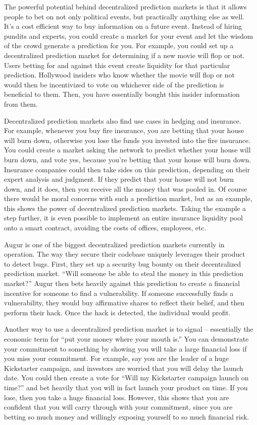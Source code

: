 \documentclass[full.tex]{subfiles}
\begin{document}
    The powerful potential behind decentralized prediction markets is that it allows people to bet on not only political events, but practically anything else as well. It's a cost efficient way to buy information on a future event. Instead of hiring pundits and experts, you could create a market for your event and let the wisdom of the crowd generate a prediction for you. For example, you could set up a decentralized prediction market for determining if a new movie will flop or not. Users betting for and against this event create liquidity for that particular prediction. Hollywood insiders who know whether the movie will flop or not would then be incentivized to vote on whichever side of the prediction is beneficial to them. Then, you have essentially bought this insider information from them.
    
    Decentralized prediction markets also find use cases in hedging and insurance. For example, whenever you buy fire insurance, you are betting that your house will burn down, otherwise you lose the funds you invested into the fire insurance. You could create a market asking the network to predict whether your house will burn down, and vote yes, because you're betting that your house will burn down. Insurance companies could then take sides on this prediction, depending on their expert analysis and judgment. If they predict that your house will not burn down, and it does, then you receive all the money that was pooled in. Of course there would be moral concerns with such a prediction market, but as an example, this shows the power of decentralized prediction markets. Taking the example a step further, it is even possible to implement an entire insurance liquidity pool onto a smart contract, avoiding the costs of offices, employees, etc.
    
    Augur is one of the biggest decentralized prediction markets currently in operation. The way they secure their codebase uniquely leverages their product to detect bugs. First, they set up a security bug bounty on their decentralized prediction market. ``Will someone be able to steal the money in this prediction market?'' Augur then bets heavily against this prediction to create a financial incentive for someone to find a vulnerability. If someone successfully finds a vulnerability, they would buy affirmative shares to reflect their belief, and then perform their hack. Once the hack is detected, the individual would profit.
    
    Another way to use a decentralized prediction market is to signal -- essentially the economic term for ``put your money where your mouth is.'' You can demonstrate your commitment to something by showing you will take a large financial loss if you miss your commitment. For example, say you are the leader of a huge Kickstarter campaign, and investors are worried that you will delay the launch date. You could then create a vote for ``Will my Kickstarter campaign launch on time?'' and bet heavily that you will in fact launch your product on time. If you lose, then you take a huge financial loss. However, this shows that you are confident that you will carry through with your commitment, since you are betting so much money and willingly exposing yourself to so much financial risk. 
    
\end{document}
